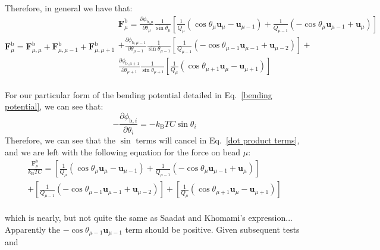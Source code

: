 \documentclass{article}
\begin{document}
Therefore, in general we have that:
\begin{subequations}
\begin{equation}
    \bm{F}^\mathrm{b}_{\mu} = \bm{F}^\mathrm{b}_{\mu, \mu} + \bm{F}^\mathrm{b}_{\mu, \mu-1} + \bm{F}^\mathrm{b}_{\mu, \mu+1}
\end{equation}
\begin{multline}
    \bm{F}^\mathrm{b}_\mu = \frac{\partial \phi_{\mathrm{b}, \mu}}{\partial \theta_{\mu}} \frac{1}{\sin{\theta_\mu}} \left[\frac{1}{Q_\mu} \left( \cos{\theta_\mu} \bm{u}_\mu - \bm{u}_{\mu-1} \right) + \frac{1}{Q_{\mu-1}} \left( -\cos{\theta_\mu} \bm{u}_{\mu-1} + \bm{u}_{\mu} \right) \right]\\
    + \frac{\partial \phi_{\mathrm{b}, \mu-1}}{\partial \theta_{\mu-1}} \frac{1}{\sin{\theta_{\mu-1}}} \left[\frac{1}{Q_{\mu-1}} \left( -\cos{\theta_{\mu-1}} \bm{u}_{\mu-1} + \bm{u}_{\mu-2} \right) \right]  + \\
    \frac{\partial \phi_{\mathrm{b}, \mu+1}}{\partial \theta_{\mu+1}} \frac{1}{\sin{\theta_{\mu+1}}} \left[\frac{1}{Q_{\mu}} \left( \cos{\theta_{\mu+1}} \bm{u}_{\mu} - \bm{u}_{\mu+1} \right) \right] \\
\end{multline}
\end{subequations}

For our particular form of the bending potential detailed in Eq.~\eqref{bending potential}, we can see that:
\begin{equation}
    -\frac{\partial \phi_{\mathrm{b},i}}{\partial \theta_{i}} = -k_\mathrm{B} T C \sin{\theta_i}
\end{equation}
Therefore, we can see that the $\sin$ terms will cancel in Eq.~\eqref{dot product terms}, and we are left with the following equation for the force on bead $\mu$:
\begin{multline}
\label{Forces for 1-cos potential}
    \frac{\bm{F}^\mathrm{b}_\mu}{k_\mathrm{B} T C} = \left[\frac{1}{Q_\mu} \left( \cos{\theta_\mu} \bm{u}_\mu - \bm{u}_{\mu-1} \right) + \frac{1}{Q_{\mu-1}} \left( -\cos{\theta_\mu} \bm{u}_{\mu-1} + \bm{u}_{\mu} \right) \right]\\
    + \left[\frac{1}{Q_{\mu-1}} \left( -\cos{\theta_{\mu-1}} \bm{u}_{\mu-1} + \bm{u}_{\mu-2} \right) \right]  + \left[\frac{1}{Q_{\mu}} \left( \cos{\theta_{\mu+1}} \bm{u}_{\mu} - \bm{u}_{\mu+1} \right) \right] \\
\end{multline}

which is nearly, but not quite the same as Saadat and Khomami's expression... Apparently the $-\cos{\theta_{\mu-1}} \bm{u}_{\mu-1}$ term should be positive.
Given subsequent tests and 
\end{document}
